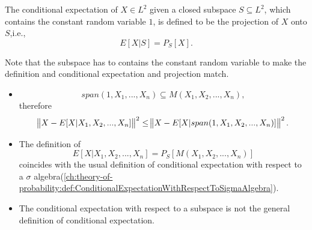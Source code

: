 \begin{refsection}
\begin{definition}
	The conditional expectation of $X\in L^2$ given a closed subspace $S\subseteq L^2$, which contains the constant random variable $1$, is defined to be the projection of $X$ onto $S$,i.e.,
	$$E[X|S] = P_S[X].$$	
\end{definition}

\begin{remark}
	Note that the subspace has to contains the constant random variable to make the definition and conditional expectation and projection match.	
\end{remark}


\begin{remark}\hfill
\begin{itemize}
	\item $$span(1,X_1,...,X_n)\subseteq M(X_1,X_2,...,X_n),$$
	therefore
	$$\norm{X - E[X|X_1,X_2,...,X_n]}^2\leq \norm{X - E[X|span(1,X_1,X_2,...,X_n)]}^2.$$
	\item The definition of $$E[X|X_1,X_2,...,X_n] = P_S[M(X_1,X_2,...,X_n)]$$
	coincides with the usual definition of conditional expectation with respect to a $\sigma$ algebra(\autoref{ch:theory-of-probability:def:ConditionalExpectationWithRespectToSigmaAlgebra}).
	\item The conditional expectation with respect to a subspace is not the general definition of conditional expectation.
\end{itemize}	
	
\end{remark}






\end{refsection}
